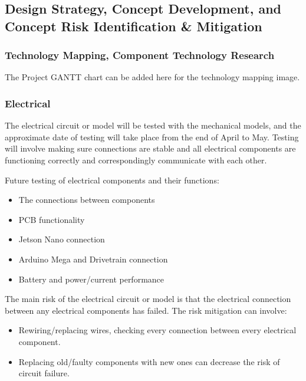 \documentclass[a4paper, 10pt]{article}
\begin{document}
	\subsection{Design Strategy, Concept Development, and Concept Risk Identification \& Mitigation}


		\subsubsection{Technology Mapping, Component Technology Research}
		
		The Project GANTT chart can be added here for the technology mapping image.

		\subsubsection{Electrical}
		The electrical circuit or model will be tested with the mechanical models, and the approximate date of testing will take place from the end of April to May. Testing will involve making sure connections are stable and all electrical components are functioning correctly and correspondingly communicate with each other. 
		
Future testing of electrical components and their functions:
\begin{itemize}
\item
The connections between components

\item
PCB functionality

\item
Jetson Nano connection

\item
Arduino Mega and Drivetrain connection

\item
Battery and power/current performance
\end{itemize}

The main risk of the electrical circuit or model is that the electrical connection between any electrical components has failed. The risk mitigation can involve:

\begin{itemize}
\item
Rewiring/replacing wires, checking every connection between every electrical component.

\item
Replacing old/faulty components with new ones can decrease the risk of circuit failure.
\end{itemize}
\end{document}
